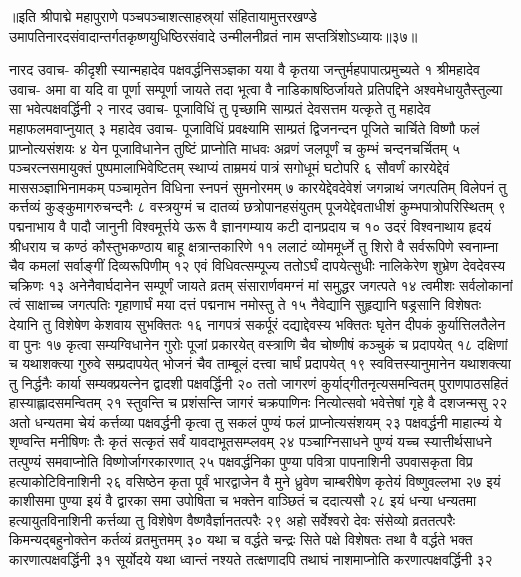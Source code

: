 ॥इति श्रीपाद्मे महापुराणे पञ्चपञ्चाशत्साहस्र्यां संहितायामुत्तरखण्डे उमापतिनारदसंवादान्तर्गतकृष्णयुधिष्ठिरसंवादे उन्मीलनीव्रतं नाम सप्तत्रिंशोऽध्यायः॥३७॥



नारद उवाच-
कीदृशी स्यान्महादेव पक्षवर्द्धनिसञ्ज्ञका 
यया वै कृतया जन्तुर्महपापात्प्रमुच्यते १
श्रीमहादेव उवाच-
अमा वा यदि वा पूर्णा सम्पूर्णा जायते तदा 
भूत्वा वै नाडिकाषष्ठिर्जायते प्रतिपद्दिने 
अश्वमेधायुतैस्तुल्या सा भवेत्पक्षवर्द्धिनी २
नारद उवाच-
पूजाविधिं तु पृच्छामि साम्प्रतं देवसत्तम 
यत्कृते तु महादेव महाफलमवाप्नुयात् ३
महादेव उवाच-
पूजाविधिं प्रवक्ष्यामि साम्प्रतं द्विजनन्दन 
पूजिते चार्चिते विष्णौ फलं प्राप्नोत्यसंशयः ४
येन पूजाविधानेन तुष्टिं प्राप्नोति माधवः 
अव्रणं जलपूर्णं च कुम्भं चन्दनचर्चितम् ५
पञ्चरत्नसमायुक्तं पुष्पमालाभिवेष्टितम् 
स्थाप्यं ताम्रमयं पात्रं सगोधूमं घटोपरि ६
सौवर्णं कारयेद्देवं माससञ्ज्ञाभिनामकम् 
पञ्चामृतेन विधिना स्नपनं सुमनोरमम् ७
कारयेद्देवदेवेशं जगन्नाथं जगत्पतिम् 
विलेपनं तु कर्त्तव्यं कुङ्कुमागरुचन्दनैः ८
वस्त्रयुग्मं च दातव्यं छत्रोपानहसंयुतम् 
पूजयेद्देवताधीशं कुम्भपात्रोपरिस्थितम् ९
पद्मनाभाय वै पादौ जानुनी विश्वमूर्त्तये 
ऊरू वै ज्ञानगम्याय कटी दानप्रदाय च १०
उदरं विश्वनाथाय हृदयं श्रीधराय च 
कण्ठं कौस्तुभकण्ठाय बाहू क्षत्रान्तकारिणे ११
ललाटं व्योममूर्ध्ने तु शिरो वै सर्वरूपिणे 
स्वनाम्ना चैव कमलां सर्वाङ्गीं दिव्यरूपिणीम् १२
एवं विधिवत्सम्पूज्य ततोऽर्घं दापयेत्सुधीः 
नालिकेरेण शुभ्रेण देवदेवस्य चक्रिणः १३
अनेनैवार्घदानेन सम्पूर्णं जायते व्रतम् 
संसारार्णवमग्नं मां समुद्धर जगत्पते १४
त्वमीशः सर्वलोकानां त्वं साक्षाच्च जगत्पतिः 
गृहाणार्घं मया दत्तं पद्मनाभ नमोस्तु ते १५
नैवेद्यानि सुहृद्यानि षड्रसानि विशेषतः 
देयानि तु विशेषेण केशवाय सुभक्तितः १६
नागपत्रं सकर्पूरं दद्याद्देवस्य भक्तितः 
घृतेन दीपकं कुर्यात्तिलतैलेन वा पुनः १७
कृत्वा सम्यग्विधानेन गुरोः पूजां प्रकारयेत् 
वस्त्राणि चैव चोष्णीषं कञ्चुकं च प्रदापयेत् १८
दक्षिणां च यथाशक्त्या गुरुवे सम्प्रदापयेत्  
भोजनं चैव ताम्बूलं दत्त्वा चार्घं प्रदापयेत् १९
स्ववित्तस्यानुमानेन यथाशक्त्या तु निर्द्धनैः 
कार्या सम्यक्प्रयत्नेन द्वादशी पक्षवर्द्धिनी २०
ततो जागरणं कुर्याद्गीतनृत्यसमन्वितम् 
पुराणपाठसहितं हास्याह्लादसमन्वितम् २१
स्तुवन्ति च प्रशंसन्ति जागरं चक्रपाणिनः 
नित्योत्सवो भवेत्तेषां गृहे वै दशजन्मसु २२
अतो धन्यतमा चेयं कर्त्तव्या पक्षवर्द्धनी 
कृत्वा तु सकलं पुण्यं फलं प्राप्नोत्यसंशयम् २३
पक्षवर्द्धनी माहात्म्यं ये शृण्वन्ति मनीषिणः 
तैः कृतं सत्कृतं सर्वं यावदाभूतसम्प्लवम् २४
पञ्चाग्निसाधने पुण्यं यच्च स्यात्तीर्थसाधने 
तत्पुण्यं समवाप्नोति विष्णोर्जागरकारणात् २५
पक्षवर्द्धनिका पुण्या पवित्रा पापनाशिनी 
उपवासकृता विप्र हत्याकोटिविनाशिनी २६
वसिष्ठेन कृता पूर्वं भारद्वाजेन वै मुने 
ध्रुवेण चाम्बरीषेण कृतेयं विष्णुवल्लभा २७
इयं काशीसमा पुण्या इयं वै द्वारका समा 
उपोषिता च भक्तेन वाञ्छितं च ददात्यसौ २८
इयं धन्या धन्यतमा हत्यायुतविनाशिनी 
कर्त्तव्या तु विशेषेण वैष्णवैर्ज्ञानतत्परैः २९
अहो सर्वेश्वरो देवः संसेव्यो व्रततत्परैः 
किमन्यद्बहुनोक्तेन कर्तव्यं व्रतमुत्तमम् ३०
यथा च वर्द्धते चन्द्रः सिते पक्षे विशेषतः 
तथा वै वर्द्धते भक्त कारणात्पक्षवर्द्धिनी ३१
सूर्योदये यथा ध्वान्तं नश्यते तत्क्षणादपि 
तथाघं नाशमाप्नोति करणात्पक्षवर्द्धिनी ३२

